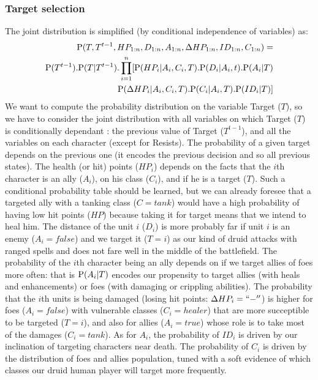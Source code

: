 \subsubsection{Target selection}
The joint distribution is simplified (by conditional independence of variables) as:
\begin{eqnarray}
\mathrm{P}(T, T^{t-1}, HP_{1:n}, D_{1:n}, A_{1:n}, \Delta HP_{1:n}, ID_{1:n}, C_{1:n}) = \\
\mathrm{P}(T^{t-1}).\mathrm{P}(T|T^{t-1}).\prod_{i=1}^n [ \mathrm{P}(HP_i | A_i, C_i, T).\mathrm{P}(D_i | A_i, t).\mathrm{P}(A_i | T)\\
\mathrm{P}(\Delta HP_i | A_i, C_i, T).\mathrm{P}(C_i | A_i, T).\mathrm{P}(ID_i | T) ]
\end{eqnarray}
We want to compute the probability distribution on the variable Target ($T$), so we have to consider the joint distribution with all variables on which Target ($T$) is conditionally dependant : the previous value of Target ($T^{t-1}$), and all the variables on each character (except for Resists). The probability of a given target depends on the previous one (it encodes the previous decision and so all previous states). The health (or hit) points ($HP_i$) depends on the facts that the $i$th character is an ally ($A_i$), on his class ($C_i$), and if he is a target ($T$). Such a conditional probability table should be learned, but we can already foresee that a targeted ally with a tanking class ($C=tank$) would have a high probability of having low hit points ($HP$) because taking it for target means that we intend to heal him. The distance of the unit $i$ ($D_i$) is more probably far if unit $i$ is an enemy ($A_i=false$) and we target it ($T=i$) as our kind of druid attacks with ranged spells and does not fare well in the middle of the battlefield. The probability of the $i$th character being an ally depends on if we target allies of foes more often: that is $\mathrm{P}(A_i|T)$ encodes our propensity to target allies (with heals and enhancements) or foes (with damaging or crippling abilities). The probability that the $i$th units is being damaged (losing hit points: $\Delta HP_i=``-''$) is higher for foes ($A_i=false$) with vulnerable classes ($C_i=healer$) that are more succeptible to be targeted ($T=i$), and also for allies ($A_i=true$) whose role is to take most of the damages ($C_i=tank$). As for $A_i$, the probability of $ID_i$ is driven by our %
inclination of targeting characters near death. The probability of $C_i$ is driven by the distribution of foes and allies population, tuned with a soft evidence of which classes our druid human player will target more frequently. %


